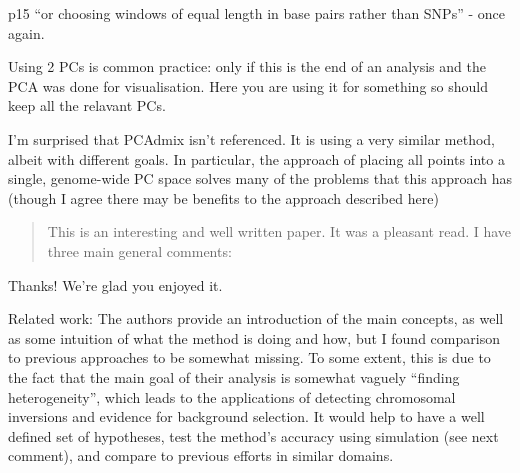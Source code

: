 
\begin{point}{p15}
 ``or choosing windows of equal length in base pairs rather than SNPs'' - once again.
\end{point}


\begin{point}{}
Using 2 PCs is common practice: only if this is the end of an analysis and the
PCA was done for visualisation. Here you are using it for something so should
keep all the relavant PCs.
\end{point}


\begin{point}{}
I'm surprised that PCAdmix isn't referenced. It is using a very similar
method, albeit with different goals. In particular, the approach of placing all
points into a single, genome-wide PC space solves many of the problems that this
approach has (though I agree there may be benefits to the approach described here)
\end{point}



\begin{quote}
    This is an interesting and well written paper. It was a pleasant read. I have three main general
    comments:
\end{quote}

Thanks! We're glad you enjoyed it.

\begin{point}{Related work:} 
The authors provide an introduction of the main concepts, as well as some
intuition of what the method is doing and how, but I found comparison to previous approaches
to be somewhat missing. To some extent, this is due to the fact that the main goal of their
analysis is somewhat vaguely ``finding heterogeneity'', which leads to the applications of
detecting chromosomal inversions and evidence for background selection. It would help to
have a well defined set of hypotheses, test the method’s accuracy  using simulation (see next
comment), and compare to previous efforts in similar domains.
\end{point}

